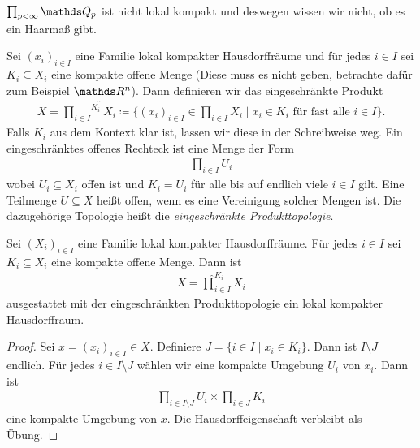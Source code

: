 \begin{bsp}
$\prod_{p <\infty} \Q_p$ ist nicht lokal kompakt und deswegen wissen wir nicht, ob es ein Haarmaß gibt.
\end{bsp}

\begin{defi}
Sei $(x_i)_{ i \in I}$ eine Familie lokal kompakter Hausdorffräume und für jedes $i \in I$ sei $K_i\subseteq X_i$ eine kompakte offene Menge
(Diese muss es nicht geben, betrachte dafür zum Beispiel $\Rn$).
Dann definieren wir das eingeschränkte Produkt
\begin{align*}
X=\widehat{{\prod_{i\in I}}^{K_i}} X_i \coloneqq \{(x_i)_{i \in I} \in \prod_{i \in I} X_i \mid x_i \in K_i \text{ für fast alle } i \in I\}.
\end{align*}
Falls $K_i$ aus dem Kontext klar ist, lassen wir diese in der Schreibweise weg.
Ein eingeschränktes offenes Rechteck ist eine Menge der Form
\begin{align*}
\prod_{i\in I} U_i
\end{align*}
wobei $U_i \subseteq X_i$ offen ist und $K_i=U_i$ für alle bis auf endlich viele $i  \in I$ gilt.
Eine Teilmenge $U\subseteq X$ heißt offen, wenn es eine Vereinigung solcher Mengen ist.
Die dazugehörige Topologie heißt die \emph{eingeschränkte Produkttopologie}.
\end{defi}

\begin{prop}
Sei $(X_i)_{i\in I}$ eine Familie lokal kompakter Hausdorffräume.
Für jedes $i \in I$ sei $K_i\subseteq X_i$ eine kompakte offene Menge.
Dann ist
\begin{align*}
X=\hat{\prod}_{i \in I}^{K_i} X_i
\end{align*}
ausgestattet mit der eingeschränkten Produkttopologie ein lokal kompakter Hausdorffraum.
\end{prop}

\begin{proof}
Sei $x=(x_i)_{i \in I} \in X$. Definiere $J=\{i \in I \mid x_i \in K_i\}$. Dann ist $I\setminus J$ endlich. Für jedes $i \in I\setminus J$ wählen wir eine kompakte Umgebung $U_i$ von $x_i$.
Dann ist
\begin{align*}
\prod_{i\in I\setminus J} U_i \times \prod_{i\in J} K_i
\end{align*}
eine kompakte Umgebung von $x$.
Die Hausdorffeigenschaft verbleibt als Übung.
\end{proof}

